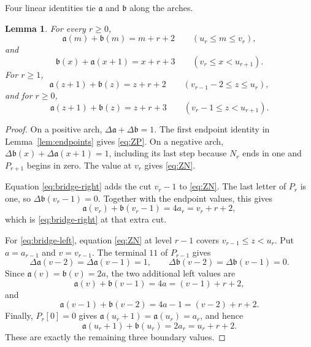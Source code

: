 \documentclass[11pt]{article}
\newtheorem{lemma}[theorem]{Lemma}
\theoremstyle{definition}
\theoremstyle{remark}
\begin{document}
Four linear identities tie $\mathfrak a$ and $\mathfrak b$ along the arches.
\begin{lemma}

For every \(r\geq0\),
\begin{equation}
\label{eq:ZP}
 \mathfrak a(m)+\mathfrak b(m)=m+r+2
 \qquad(u_r\leq m\leq v_r),
\end{equation}
and
\begin{equation}
\label{eq:ZN}
 \mathfrak b(x)+\mathfrak a(x+1)=x+r+3
 \qquad(v_r\leq x<u_{r+1}).
\end{equation}
For \(r\geq1\),
\begin{equation}
\label{eq:bridge-left}
 \mathfrak a(z+1)+\mathfrak b(z)=z+r+2
 \qquad(v_{r-1}-2\leq z\leq u_r),
\end{equation}
and for \(r\geq0\),
\begin{equation}
\label{eq:bridge-right}
 \mathfrak a(z+1)+\mathfrak b(z)=z+r+3
 \qquad(v_r-1\leq z<u_{r+1}).
\end{equation}
\end{lemma}

\begin{proof}
On a positive arch, \(\Delta\mathfrak a+\Delta\mathfrak b=1\).  The first endpoint identity
in Lemma~\ref{lem:endpoints} gives \eqref{eq:ZP}.  On a negative arch,
\(\Delta \mathfrak b(x)+\Delta \mathfrak a(x+1)=1\), including its last step because \(N_r\)
ends in one and \(P_{r+1}\) begins in zero.  The value at \(v_r\) gives
\eqref{eq:ZN}.

Equation \eqref{eq:bridge-right} adds the cut \(v_r-1\) to \eqref{eq:ZN}.
The last letter of \(P_r\) is one, so \(\Delta \mathfrak b(v_r-1)=0\).
Together with the endpoint values, this gives
\[
 \mathfrak a(v_r)+\mathfrak b(v_r-1)=4a_r=v_r+r+2,
\]
which is \eqref{eq:bridge-right} at that extra cut.

For \eqref{eq:bridge-left}, equation \eqref{eq:ZN} at level \(r-1\) covers
\(v_{r-1}\leq z<u_r\).  Put \(a=a_{r-1}\) and \(v=v_{r-1}\).  The terminal
\(11\) of \(P_{r-1}\) gives
\[
 \Delta\mathfrak a(v-2)=\Delta\mathfrak a(v-1)=1,
 \qquad
 \Delta\mathfrak b(v-2)=\Delta\mathfrak b(v-1)=0.
\]
Since \(\mathfrak a(v)=\mathfrak b(v)=2a\), the two additional left values
are
\[
 \mathfrak a(v)+\mathfrak b(v-1)=4a=(v-1)+r+2,
\]
and
\[
 \mathfrak a(v-1)+\mathfrak b(v-2)=4a-1=(v-2)+r+2.
\]
Finally, \(P_r[0]=0\) gives
\(\mathfrak a(u_r+1)=\mathfrak a(u_r)=a_r\), and hence
\[
 \mathfrak a(u_r+1)+\mathfrak b(u_r)=2a_r=u_r+r+2.
\]
These are exactly the remaining three boundary values.
\end{proof}
\end{document}
